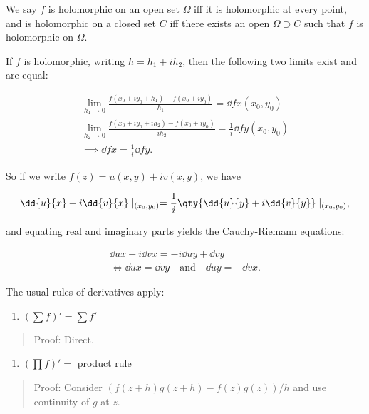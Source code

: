 We say \(f\) is holomorphic on an open set \(\Omega\) iff it is
holomorphic at every point, and is holomorphic on a closed set \(C\) iff
there exists an open \(\Omega \supset C\) such that \(f\) is holomorphic
on \(\Omega\).

If \(f\) is holomorphic, writing \(h = h_1 + ih_2\), then the following
two limits exist and are equal:

\begin{align*}
\lim_{h_1 \to 0} \frac{f(x_0 + iy_0 + h_1) - f(x_0 + iy_0)}{h_1} = \dd{f}{x}(x_0, y_0) \\
\lim_{h_2 \to 0} \frac{f(x_0 + iy_0 + ih_2) - f(x_0 + iy_0)}{ih_2} = \frac 1 i \dd{f}{y}(x_0, y_0) \\
\implies \dd{f}{x} = \frac 1  i \dd{f}{y}
.\end{align*}

So if we write \(f(z) = u(x, y) + i v(x, y)\), we have

\begin{align*}
\dd{u}{x} + i \dd{v}{x} \mid_{(x_0, y_0)} = \frac 1 i \qty{
\dd{u}{y} + i \dd{v}{y}
} \mid_{(x_0, y_0)}
,\end{align*}

and equating real and imaginary parts yields the Cauchy-Riemann
equations:

\begin{align*}
\dd{u}{x} + i \dd{v}{x} = -i \dd{u}{y} + \dd{v}{y} \\
\iff \dd{u}{x} = \dd{v}{y} \quad\text{and}\quad \dd{u}{y} = - \dd{v}{x}
.\end{align*}

The usual rules of derivatives apply:

\begin{enumerate}
\def\labelenumi{\arabic{enumi}.}
\tightlist
\item
  \((\sum f)' = \sum f'\)
\end{enumerate}

\begin{quote}
Proof: Direct.
\end{quote}

\begin{enumerate}
\def\labelenumi{\arabic{enumi}.}
\setcounter{enumi}{1}
\tightlist
\item
  \((\prod f)' =\) product rule
\end{enumerate}

\begin{quote}
Proof: Consider \((f(z+h)g(z+h) - f(z)g(z))/h\) and use continuity of
\(g\) at \(z\).
\end{quote}

